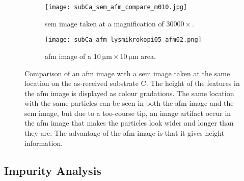 \begin{figure}[htbp]
    \centering
    \begin{subfigure}[t]{0.45\linewidth}
        \texttt{[image: subCa\_sem\_afm\_compare\_m010.jpg]}
        \caption{\Ac{sem} image taken at a magnification of $30000\times$.}
    \end{subfigure}%
    \begin{subfigure}[t]{0.45\linewidth}
        \texttt{[image: subCa\_afm\_lysmikrokopi05\_afm02.png]}
        \caption{\Ac{afm} image of a $\SI{10}{\micro\metre}\times\SI{10}{\micro\metre}$ area.}
    \end{subfigure}%
    \caption[Comparison of an \ac{afm} image with a \ac{sem} image taken at the same location on substrate C.]{Comparison of an \ac{afm} image with a \ac{sem} image taken at the same location on the as-received substrate C. The height of the features in the \ac{afm} image is displayed as colour gradations. The same location with the same particles can be seen in both the \ac{afm} image and the \ac{sem} image, but due to a too-course tip, an image artifact occur in the \ac{afm} image that makes the particles look wider and longer than they are. The advantage of the \ac{afm} image is that it gives height information.}
    \label{fig:sem-afm-comparison}
\end{figure}


\subsection{Impurity Analysis}

